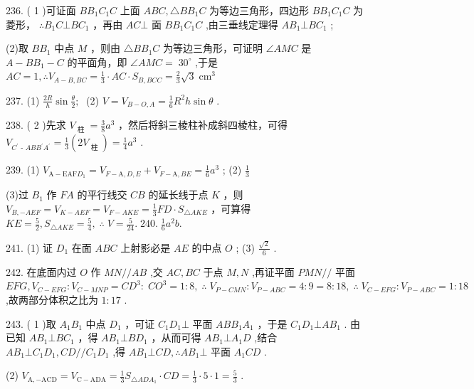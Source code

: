 \documentclass[10pt]{article}
\begin{document}
236. ( 1 )可证面 \(B{B}_{1}{C}_{1}C\) 上面 \({ABC},\bigtriangleup B{B}_{1}C\) 为等边三角形，四边形 \(B{B}_{1}{C}_{1}C\) 为菱形， \(\therefore {B}_{1}C \bot  B{C}_{1}\) ，再由 \({AC} \bot\) 面 \(B{B}_{1}{C}_{1}C\) ,由三垂线定理得 \(A{B}_{1} \bot  B{C}_{1}\) ;

(2)取 \(B{B}_{1}\) 中点 \(M\) ，则由 \(\bigtriangleup B{B}_{1}C\) 为等边三角形，可证明 \(\angle {AMC}\) 是 \(A - B{B}_{1} - C\) 的平面角，即 \(\angle {AMC} = \; {30}^{ \circ  }\) ,于是 \({AC} = 1,\therefore {V}_{A - B,{BC}} = \frac{1}{3} \cdot  {AC} \cdot  {S}_{B,{BCC}} = \frac{2}{3}\sqrt{3}{\mathrm{\;{cm}}}^{3}\)

237. (1) \(\frac{2R}{h}\sin \frac{\theta }{2};\;\) (2) \(V = {V}_{B - O,A} = \frac{1}{6}{R}^{2}h\sin \theta\) .

238. ( 2 )先求 \({V}_{\text{ 柱 }} = \frac{3}{8}{a}^{3}\) ，然后将斜三棱柱补成斜四棱柱，可得 \({V}_{{C}^{\prime }\text{ - }{AB}{B}^{\prime }{A}^{\prime }} = \frac{1}{3}\left( {2{V}_{\text{ 柱 }}}\right)  = \frac{1}{4}{a}^{3}\) .

239. (1) \({V}_{\mathrm{A} - \mathrm{{EAF}}{D}_{1}} = {V}_{F - \mathrm{A},D,E} + {V}_{F - \mathrm{A},{BE}} = \frac{1}{6}{a}^{3}\) ; (2) \(\frac{1}{3}\)

(3)过 \({B}_{1}\) 作 \({FA}\) 的平行线交 \({CB}\) 的延长线于点 \(K\) ，则 \({V}_{B, - {AEF}} = {V}_{K - {AEF}} = {V}_{F - {AKE}} = \frac{1}{3}{FD} \cdot  {S}_{\bigtriangleup {AKE}}\) ，可算得 \({KE} = \frac{5}{2},{S}_{\bigtriangleup {AKE}} = \frac{5}{4},\;\therefore \;V = \frac{5}{24}.\;{240}.\;\frac{1}{6}{a}^{2}b.\)

241. (1) 证 \({D}_{1}\) 在面 \({ABC}\) 上射影必是 \({AE}\) 的中点 \(O\) ; (3) \(\frac{\sqrt{2}}{6}\) .

242. 在底面内过 \(O\) 作 \({MN}//{AB}\) ,交 \({AC},{BC}\) 于点 \(M,N\) ,再证平面 \({PMN}//\) 平面 \({EFG},{V}_{C - {EFG}} : {V}_{C - {MNP}} = C{D}^{3} : \; C{O}^{3} = 1 : 8,\;\therefore \;{V}_{P - {CMN}} : {V}_{P - {ABC}} = 4 : 9 = 8 : {18},\;\therefore \;{V}_{C - {EFG}} : {V}_{P - {ABC}} = 1 : {18}\) ,故两部分体积之比为 \(1 : {17}\) .

243. ( 1 )取 \({A}_{1}{B}_{1}\) 中点 \({D}_{1}\) ，可证 \({C}_{1}{D}_{1} \bot\) 平面 \({AB}{B}_{1}{A}_{1}\) ，于是 \({C}_{1}{D}_{1} \bot  A{B}_{1}\) . 由已知 \(A{B}_{1} \bot  B{C}_{1}\) ，得 \(A{B}_{1} \bot  B{D}_{1}\) ，从而可得 \(A{B}_{1} \bot  {A}_{1}D\) ,结合 \(A{B}_{1} \bot  {C}_{1}{D}_{1},{CD}//{C}_{1}{D}_{1}\) ,得 \(A{B}_{1} \bot  {CD},\therefore A{B}_{1} \bot\) 平面 \({A}_{1}{CD}\) .

(2) \({V}_{\mathrm{A}, - \mathrm{{ACD}}} = {V}_{\mathrm{C} - \mathrm{{ADA}}} = \frac{1}{3}{S}_{\bigtriangleup {AD}{A}_{1}} \cdot  {CD} = \frac{1}{3} \cdot  5 \cdot  1 = \frac{5}{3}\) .
\end{document}
